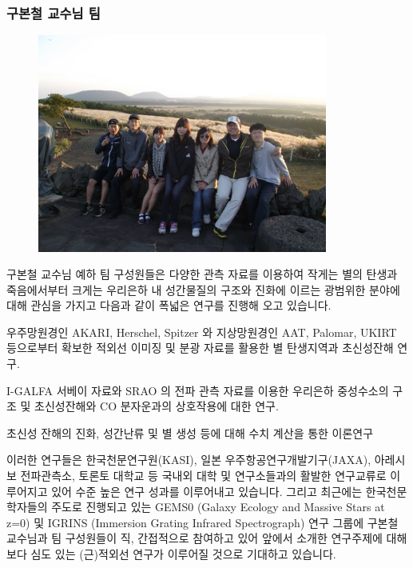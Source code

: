 \subsubsection{구본철 교수님 팀}
\begin{figure}
\begin{center}
\includegraphics[width=0.85\textwidth]{./Figures/team-koo.jpg}
\end{center}
\end{figure}
구본철 교수님 예하 팀 구성원들은 다양한 관측 자료를 이용하여 작게는 별의 탄생과 죽음에서부터 크게는 우리은하 내 성간물질의 구조와 진화에 이르는 광범위한 분야에 대해 관심을 가지고 다음과 같이 폭넓은 연구를 진행해 오고 있습니다.
\begin{packed_enum}
\item 우주망원경인 AKARI, Herschel, Spitzer 와 지상망원경인 AAT, Palomar, UKIRT 등으로부터 확보한 적외선 이미징 및 분광 자료를 활용한 별 탄생지역과 초신성잔해 연구. 
\item I-GALFA 서베이 자료와 SRAO 의 전파 관측 자료를 이용한 우리은하 중성수소의 구조 및 초신성잔해와 CO 분자운과의 상호작용에 대한 연구. 
\item 초신성 잔해의 진화, 성간난류 및 별 생성 등에 대해 수치 계산을 통한 이론연구
\end{packed_enum}
이러한 연구들은 한국천문연구원(KASI), 일본 우주항공연구개발기구(JAXA), 아레시보 전파관측소, 토론토 대학교 등 국내외 대학 및 연구소들과의 활발한 연구교류로 이루어지고 있어 수준 높은 연구 성과를 이루어내고 있습니다. 그리고 최근에는 한국천문학자들의 주도로 진행되고 있는 GEMS0 (Galaxy Ecology and Massive Stars at z=0) 및 IGRINS (Immersion Grating Infrared Spectrograph) 연구 그룹에 구본철 교수님과 팀 구성원들이 직, 간접적으로 참여하고 있어 앞에서 소개한 연구주제에 대해 보다 심도 있는 (근)적외선 연구가 이루어질 것으로 기대하고 있습니다.

